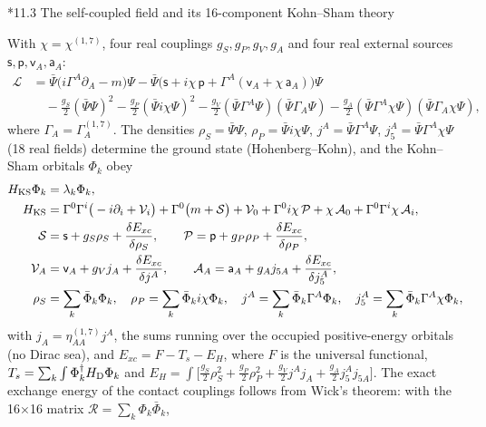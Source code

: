 \documentclass[10pt,a4paper]{article}
\makeatletter
\renewcommand\subsection{\@startsection{subsection}{2}{\z@}{-3.25ex\@plus -1ex \@minus -.2ex}{1.5ex \@plus .2ex}{\normalfont\large\bfseries\raggedright}}
\makeatother
\begin{document}
\subsection*{11.3 The self-coupled field and its 16-component Kohn–Sham theory}
With $\chi=\chi^{(1,7)}$, four real couplings $g_S,g_P,g_V,g_A$ and four real external sources $\mathsf s,\mathsf p,\mathsf v_A,\mathsf a_A$:
\begin{align*}
\mathcal L&=\bar\Psi\big(i\Gamma^{A}\partial_A-m\big)\Psi-\bar\Psi\big(\mathsf s+i\chi\,\mathsf p+\Gamma^{A}(\mathsf v_A+\chi\,\mathsf a_A)\big)\Psi \\
&\quad-\frac{g_S}2(\bar\Psi\Psi)^2-\frac{g_P}2(\bar\Psi i\chi\Psi)^2-\frac{g_V}2(\bar\Psi\Gamma^{A}\Psi)(\bar\Psi\Gamma_{A}\Psi)-\frac{g_A}2(\bar\Psi\Gamma^{A}\chi\Psi)(\bar\Psi\Gamma_{A}\chi\Psi),
\end{align*}
where $\Gamma_A=\Gamma^{(1,7)}_A$. The densities $\rho_S=\bar\Psi\Psi$, $\rho_P=\bar\Psi i\chi\Psi$, $j^A=\bar\Psi\Gamma^A\Psi$, $j_5^A=\bar\Psi\Gamma^A\chi\Psi$ (18 real fields) determine the ground state (Hohenberg–Kohn), and the Kohn–Sham orbitals $\Phi_k$ obey
\begin{align*}
H_{\rm KS}\Phi_k&=\lambda_k\Phi_k, \\
H_{\rm KS}&=\Gamma^{0}\Gamma^{i}\big(-i\partial_i+\mathcal V_i\big)+\Gamma^{0}\big(m+\mathcal S\big)+\mathcal V_0+\Gamma^{0}i\chi\,\mathcal P+\chi\,\mathcal A_0+\Gamma^{0}\Gamma^{i}\chi\,\mathcal A_i, \\
\mathcal S&=\mathsf s+g_S\rho_S+\frac{\delta E_{xc}}{\delta\rho_S},\qquad \mathcal P=\mathsf p+g_P\rho_P+\frac{\delta E_{xc}}{\delta\rho_P}, \\
\mathcal V_A&=\mathsf v_A+g_Vj_A+\frac{\delta E_{xc}}{\delta j^A},\qquad \mathcal A_A=\mathsf a_A+g_Aj_{5A}+\frac{\delta E_{xc}}{\delta j_5^A}, \\
\rho_S&=\sum_k\bar\Phi_k\Phi_k,\quad \rho_P=\sum_k\bar\Phi_ki\chi\Phi_k,\quad j^A=\sum_k\bar\Phi_k\Gamma^{A}\Phi_k,\quad j_5^A=\sum_k\bar\Phi_k\Gamma^{A}\chi\Phi_k,
\end{align*}
with $j_A=\eta^{(1,7)}_{AA}j^A$, the sums running over the occupied positive-energy orbitals (no Dirac sea), and $E_{xc}=F-T_s-E_H$, where $F$ is the universal functional, $T_s=\sum_k\int\Phi_k^\dagger H_{\rm D}\Phi_k$ and $E_H=\int\big[\frac{g_S}2\rho_S^2+\frac{g_P}2\rho_P^2+\frac{g_V}2j^Aj_A+\frac{g_A}2j_5^Aj_{5A}\big]$. The exact exchange energy of the contact couplings follows from Wick’s theorem: with the 16×16 matrix $\mathcal R=\sum_k\Phi_k\bar\Phi_k$,
\end{document}
